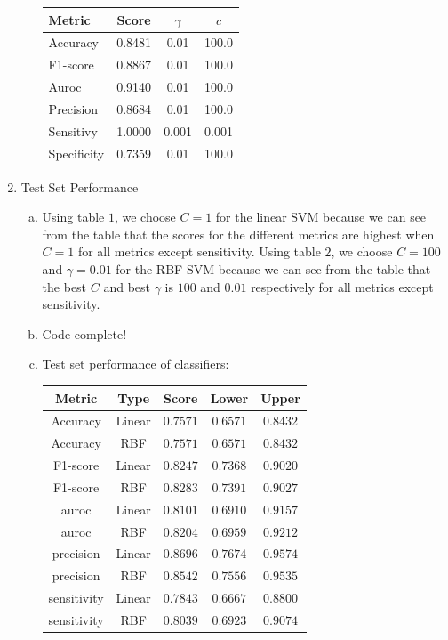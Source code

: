 \documentclass[11pt]{article}
\begin{document}
\begin{enumerate}
\begin{enumerate}[(a)]
\begin{tabular}{| l | c | c | c |}
\hline
Metric & Score & $\gamma$ & $c$ \\
\hline
Accuracy & 0.8481 & 0.01 & 100.0 \\
F1-score & 0.8867 & 0.01 & 100.0 \\
Auroc & 0.9140 & 0.01 & 100.0 \\
Precision & 0.8684 & 0.01 & 100.0 \\
Sensitivy & 1.0000 & 0.001 & 0.001 \\
Specificity & 0.7359 & 0.01 & 100.0 \\
\hline
\end{tabular}
\end{enumerate}
\item Test Set Performance
\begin{enumerate}[(a)]
\item Using table $1$, we choose $C=1$ for the linear SVM because we can see from the table that the scores for the different metrics are highest when $C=1$ for all metrics except sensitivity. Using table $2$, we choose $C=100$ and $\gamma = 0.01$ for the RBF SVM because we can see from the table that  the best $C$ and best $\gamma$ is $100$ and $0.01$ respectively for all metrics except sensitivity. 
\item Code complete!
\item Test set performance of classifiers: \\
\begin{tabular}{| c | c | c | c | c |}
\hline
Metric & Type &Score & Lower & Upper \\
\hline
Accuracy & Linear & $0.7571$ & $0.6571$ & $0.8432$ \\
Accuracy & RBF & $0.7571$ & $0.6571$ & $0.8432$ \\
F1-score & Linear & $0.8247$ & $0.7368$ & $0.9020$ \\
F1-score & RBF & $0.8283$ & $0.7391$ & $0.9027$ \\
auroc & Linear & $0.8101$ & $0.6910$ & $0.9157$ \\
auroc & RBF & $0.8204$ & $0.6959$ & $0.9212$ \\
precision & Linear & $0.8696$ & $0.7674$ & $0.9574$ \\
precision & RBF & $0.8542$ & $0.7556$ & $0.9535$ \\
sensitivity & Linear & $0.7843$ & $0.6667$ & $0.8800$ \\
sensitivity & RBF & $0.8039$ & $0.6923$ & $0.9074$ \\

\end{tabular}
\end{enumerate}
\end{enumerate}
\end{document}
